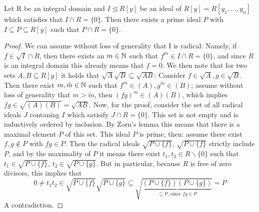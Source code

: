 \begin{lem}\label{primeoverp1}
Let R be an integral domain and $I \unlhd R[y]$ be an ideal of $R[y] = R[y_1,\ldots,y_n]$ which satisfies that $I \cap R = \{ 0 \}$.
Then there exists a prime ideal $P$ with $I \subseteq P \subseteq R[y] $ such that $P \cap R = \{0\}$.
\begin{proof}
We can assume without loss of generality that I is radical:
Namely, if $f \in \sqrt{I} \cap R$, then there exists an $m \in \mathbb{N}$ such that $f^m \in I \cap R = \{0\}$, and since $R$ is an integral domain this already means that $f = 0$.
We then note that for two sets $A,B \subseteq R[y]$ it holds that $\sqrt{A}\sqrt{B} \subseteq \sqrt{AB}$: Consider $f \in \sqrt{A}, g \in \sqrt{B}$. Then there exist $m, \tilde m \in \mathbb{N}$ such that $f^m \in (A), g^{\tilde m} \in (B)$;
 assume without loss of generality that $m > \tilde m$, then $(fg)^m \in (A)(B)$, which implies $fg \in \sqrt{(A)(B)} = \sqrt{AB}$.
Now, for the proof, consider the set of all radical ideals $J$ contaning $I$ which satisify $J \cap R = \{0\}$. This set is not empty and is inductively ordered by inclusion.
By Zorn's lemma this means that there is a maximal element $P$ of this set. This ideal $P$ is prime, then: assume there exist $f,g \notin P$ with $fg \in P$. 
Then the radical ideals $\sqrt{P \cup \{f\}}$, $\sqrt{P \cup \{f\}}$ strictly include $P$, and by the maximality of $P$ it means there exist $t_1, t_2 \in R\backslash\{0\}$ such that
$t_1 \in \sqrt{P \cup \{f\}}$, $t_2 \in \sqrt{P \cup \{g\}}$. But in particular, because $R$ is free of zero divisors, this implies that
 \[0 \neq t_1t_2 \in \sqrt{P \cup \{f\}}\sqrt{P \cup \{g\}} \subseteq \sqrt{ \underbrace{(P \cup \{f\})(P \cup \{g\})}_{\subseteq P\text{, since }fg \in P}} = P\]
A contradiction.
\end{proof}
\end{lem}



